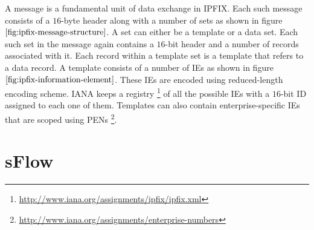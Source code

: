 A message is a fundamental unit of data exchange in \ac{IPFIX}. Each such message consists of a $16$-byte header along with a number of sets as shown in figure $\ref{fig:ipfix-message-structure}$. A set can either be a template or a data set. Each such set in the message again contains a $16$-bit header and a number of records  associated with it. Each record within a template set is a template that refers to a data record.  A template consists of a number of \ac{IEs} as shown in figure $\ref{fig:ipfix-information-element}$. These \ac{IEs} are encoded using reduced-length encoding scheme. \ac{IANA} keeps a registry \footnote{\url{http://www.iana.org/assignments/ipfix/ipfix.xml}} of all the possible \ac{IEs} with a $16$-bit ID assigned to each one of them. Templates can also contain enterprise-specific \ac{IEs} that are scoped using \ac{PENs} \footnote{\url{http://www.iana.org/assignments/enterprise-numbers}}. 


\section{sFlow}\label{sec:sflow}

